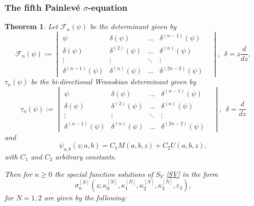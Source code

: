 \documentclass[12pt]{article}
\def\P{Painlev\'e }
\def\F{\mathcal{F}}
\newtheorem{mydef}{Theorem}[section]
\numberwithin{figure}{section}
\numberwithin{equation}{section}
\numberwithin{table}{section}
\begin{document}
\subsubsection{The fifth \P $\sigma$-equation}
\begin{mydef}
Let $\F_n(\psi)$ be the determinant given by
\[
\F_n(\psi):=
\!\begin{vmatrix}
\psi & \delta(\psi) &\hdots& \delta^{(n-1)}(\psi) \\
\delta(\psi) & \delta^{(2)}(\psi) &\hdots& \delta^{(n)}(\psi)  \\
\vdots &\vdots & \ddots & \vdots & \\
\delta^{(n-1)}(\psi) & \delta^{(n)}(\psi) &\hdots& \delta^{(2n-2)}(\psi)
\end{vmatrix},~~\delta=z\frac{d}{dz},
\]
$\tau_n(\psi)$ be the bi-directional Wronskian determinant given by
\[
\tau_n(\psi):=
\!\begin{vmatrix}
\psi & \delta(\psi) &\hdots& \delta^{(n-1)}(\psi) \\
\delta(\psi) & \delta^{(2)}(\psi) &\hdots& \delta^{(n)}(\psi)  \\
\vdots &\vdots & \ddots & \vdots & \\
\delta^{(n-1)}(\psi) & \delta^{(n)}(\psi) &\hdots& \delta^{(2n-2)}(\psi)
\end{vmatrix},~~\delta=\frac{d}{dz}
\]
and
\begin{equation}
\psi_{a,b}(z;a,b)=C_1M(a,b,z)+C_2U(a,b,z),\label{psi}
\end{equation}
with $C_1$ and $C_2$ arbitrary constants.

Then for $n\geq0$ the special function solutions of $S_{V}$ \eqref{SV} in the form $$\sigma_n^{[N]}(z;\kappa_0^{[N]},\kappa_1^{[N]},\kappa_2^{[N]},\kappa_3^{[N]},\varepsilon_3),$$ for $N=1,2$ are given by the following:


\end{mydef}
\end{document}
